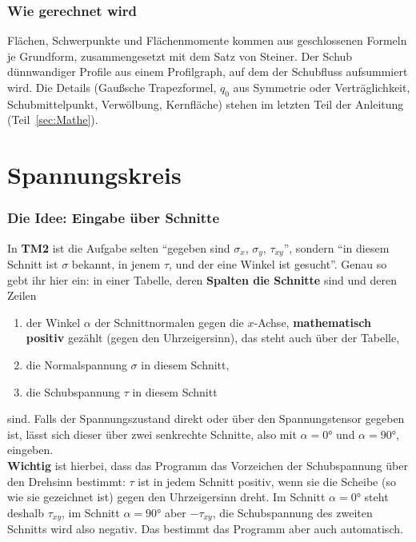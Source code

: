 \section{Wie gerechnet wird}

Flächen, Schwerpunkte und Flächenmomente kommen aus geschlossenen Formeln je Grundform,
zusammengesetzt mit dem Satz von Steiner. Der Schub dünnwandiger Profile aus einem Profilgraph,
auf dem der Schubfluss aufsummiert wird. Die Details (Gaußsche Trapezformel, $q_0$ aus Symmetrie
oder Verträglichkeit, Schubmittelpunkt, Verwölbung, Kernfläche) stehen im letzten Teil der
Anleitung (Teil~\ref{sec:Mathe}).

\part{Spannungskreis}

\section{Die Idee: Eingabe über Schnitte}\label{sec:kreis-eingabe}

In \textbf{TM2} ist die Aufgabe selten \enquote{gegeben sind $\sigma_x$, $\sigma_y$,
$\tau_{xy}$}, sondern \enquote{in diesem Schnitt ist $\sigma$ bekannt, in jenem $\tau$, und der
eine Winkel ist gesucht}. Genau so gebt ihr hier ein: in einer Tabelle, deren \textbf{Spalten die
Schnitte} sind und deren Zeilen

\begin{enumerate}
  \item der Winkel $\alpha$ der Schnittnormalen gegen die $x$-Achse, \textbf{mathematisch
        positiv} gezählt (gegen den Uhrzeigersinn), das steht auch über der Tabelle,
  \item die Normalspannung $\sigma$ in diesem Schnitt,
  \item die Schubspannung $\tau$ in diesem Schnitt
\end{enumerate}

sind. Falls der Spannungszustand direkt oder über den Spannungstensor gegeben ist, lässt sich
dieser über zwei senkrechte Schnitte, also mit $\alpha = 0°$ und $\alpha = 90°$, eingeben.\\
\textbf{Wichtig} ist hierbei, dass das Programm das Vorzeichen der Schubspannung über den Drehsinn
bestimmt: $\tau$ ist in jedem Schnitt positiv, wenn sie die Scheibe (so wie sie gezeichnet ist)
gegen den Uhrzeigersinn dreht. Im Schnitt $\alpha = 0°$ steht deshalb $\tau_{xy}$, im Schnitt
$\alpha = 90°$ aber $-\tau_{xy}$, die Schubspannung des zweiten Schnitts wird also negativ. Das
bestimmt das Programm aber auch automatisch.

